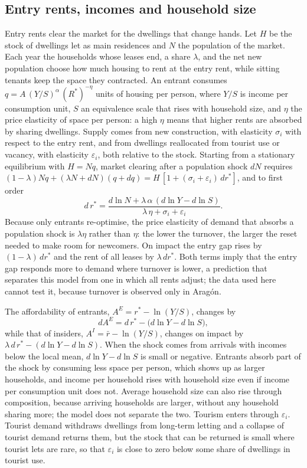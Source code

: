 \documentclass[11pt,a4paper]{article}
\begin{document}
\subsection{Entry rents, incomes and household size}

Entry rents clear the market for the dwellings that change hands. Let $H$ be the stock of dwellings let as main residences and $N$ the population of the market. Each year the households whose leases end, a share $\lambda$, and the net new population choose how much housing to rent at the entry rent, while sitting tenants keep the space they contracted. An entrant consumes $q=A\,(Y/S)^{\alpha}\,(R^*)^{-\eta}$ units of housing per person, where $Y/S$ is income per consumption unit, $S$ an equivalence scale that rises with household size, and $\eta$ the price elasticity of space per person: a high $\eta$ means that higher rents are absorbed by sharing dwellings. Supply comes from new construction, with elasticity $\sigma_i$ with respect to the entry rent, and from dwellings reallocated from tourist use or vacancy, with elasticity $\varepsilon_i$, both relative to the stock. Starting from a stationary equilibrium with $H=Nq$, market clearing after a population shock $dN$ requires $(1-\lambda)Nq+(\lambda N+dN)(q+dq)=H\,[1+(\sigma_i+\varepsilon_i)\,dr^*]$, and to first order
\begin{equation}\label{eq:entry}
d\,r^*=\frac{d\ln N+\lambda\,\alpha\,(d\ln Y-d\ln S)}{\lambda\,\eta+\sigma_i+\varepsilon_i}.
\end{equation}
Because only entrants re-optimise, the price elasticity of demand that absorbs a population shock is $\lambda\eta$ rather than $\eta$: the lower the turnover, the larger the reset needed to make room for newcomers. On impact the entry gap rises by $(1-\lambda)\,dr^*$ and the rent of all leases by $\lambda\,dr^*$. Both terms imply that the entry gap responds more to demand where turnover is lower, a prediction that separates this model from one in which all rents adjust; the data used here cannot test it, because turnover is observed only in Aragón.

The affordability of entrants, $A^E=r^*-\ln(Y/S)$, changes by
\begin{equation}\label{eq:aff}
dA^E=d\,r^*-\big(d\ln Y-d\ln S\big),
\end{equation}
while that of insiders, $A^I=\bar r-\ln(Y/S)$, changes on impact by $\lambda\,d\,r^*-(d\ln Y-d\ln S)$. When the shock comes from arrivals with incomes below the local mean, $d\ln Y-d\ln S$ is small or negative. Entrants absorb part of the shock by consuming less space per person, which shows up as larger households, and income per household rises with household size even if income per consumption unit does not. Average household size can also rise through composition, because arriving households are larger, without any household sharing more; the model does not separate the two. Tourism enters through $\varepsilon_i$. Tourist demand withdraws dwellings from long-term letting and a collapse of tourist demand returns them, but the stock that can be returned is small where tourist lets are rare, so that $\varepsilon_i$ is close to zero below some share of dwellings in tourist use.
\end{document}

